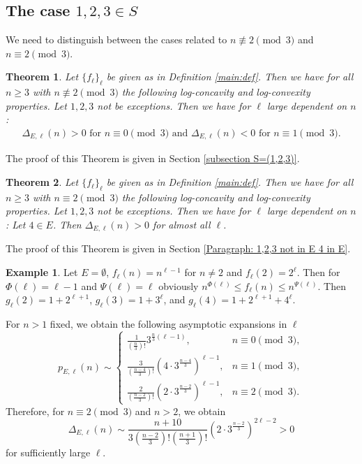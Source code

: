 \documentclass[12pt]{amsart}
\newtheorem{theorem}{Theorem}
\theoremstyle{definition}
\newtheorem{example}{Example}
\theoremstyle{remark}
\numberwithin{theorem}{section} \numberwithin{equation}{section}
\begin{document}
\subsection{The case $1,2,3 \in S $}
We need to distinguish between the cases related to $n \not\equiv 2 \pmod{3}$ and
$n \equiv 2 \pmod{3}$.

\begin{theorem}
\label{th123}Let $\{f_{\ell}\}_{\ell}$ be given as in Definition \ref{main:def}.
Then we have for all $n\geq3$ with $n\not\equiv 2 \pmod{3}$ the following log-concavity and log-convexity properties. Let $1,2,3$
not be
exceptions. Then we have for $\ell$ large dependent on $n$:
\begin{eqnarray*}
\Delta _{E,\ell }\left( n\right) >
0 \text{ for }n
\equiv 0 \pmod{3} \text{ and }\Delta _{E,\ell}\left( n\right)
<0 \text{ for }n\equiv 1
\pmod{3}. 
\end{eqnarray*}
\end{theorem}
The proof of this Theorem is given in Section \ref{subsection S=(1,2,3)}.
\begin{theorem}
\label{th1234}Let $\{f_{\ell}\}_{\ell}$ be given as in Definition \ref{main:def}.
Then we have for all $n\geq3$ with $n \equiv 2 \pmod{3}$ the following log-concavity and log-convexity properties. Let $1,2,3$
not be
exceptions. Then we have for $\ell$ large dependent on $n$:
Let $4 \in E$. Then $\Delta _{E,\ell }\left( n\right)
> 0$ for almost all $\ell$.
\end{theorem}
The proof of this Theorem is given in Section 
\ref{Paragraph: 1,2,3 not in E 4 in E}.
\begin{example}
Let $E=\emptyset $,
$f_{\ell }\left( n\right) =n^{\ell -1}$ for $n\neq 2$ and
$f_{\ell }\left( 2\right) =2^{\ell }$. Then for
$\Phi \left( \ell \right) =\ell -1$ and
$\Psi \left( \ell \right) =\ell $ obviously
$n^{\Phi \left( \ell \right) }\leq f_{\ell }\left( n\right) \leq
n^{\Psi \left( \ell \right) }$.
Then $g_{\ell }\left( 2\right) =1+2^{\ell +1}$,
$g_{\ell }\left( 3\right) =1+3^{\ell }$, and
$g_{\ell }\left( 4\right) =1+2^{\ell +1}+4^{\ell }$.

For $n>1$ fixed, we obtain the following asymptotic expansions in $\ell $
\[
p_{E,\ell }\left( n\right) \sim \left\{
\begin{array}{ll}
\frac{1}{\left( \frac{n}{3}\right) !}3^{\frac{n}{3}\left( \ell -1\right) }
,&n\equiv 0\pmod{3},\\
\frac{3}{\left( \frac{n-4}{3}\right) !}
\left( 4\cdot 3^{\frac{n-4}{3}}\right) ^{\ell -1}
,&n\equiv 1\pmod{3},\\
\frac{2
}{\left( \frac{n-2}{3}\right) !}
\left( 2\cdot 3^{\frac{n-2}{3}}\right) ^{\ell -1}
,&n\equiv 2\pmod{3}.
\end{array}
\right.
\]
Therefore, for $n\equiv 2\pmod{3}$ and $n>2$, we obtain
\[
\Delta _{E,\ell }\left( n\right)
\sim \frac{n+10
}{3\left( \frac{n-2}{3}\right) !\left( \frac{n+1}{3}\right) !}
\left( 2\cdot 3^{\frac{n-2}{3}}\right) ^{2\ell -2}
>0
\]
for sufficiently large $\ell $.
\end{example}
\end{document}
